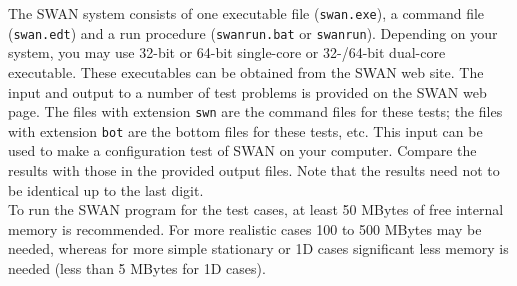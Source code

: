 \documentclass[12pt]{book}
\begin{document}
 \label{ch:test}

The SWAN system consists of one executable file ({\tt swan.exe}), a command file ({\tt swan.edt}) and
a run procedure ({\tt swanrun.bat} or {\tt swanrun}).
Depending on your system, you may use 32-bit or 64-bit single-core or 32-/64-bit dual-core executable.
These executables can be obtained from the SWAN web site.
The input and output to a number of test problems
is provided on the SWAN web page. The files with extension {\tt swn} are the command files for these
tests; the files with extension {\tt bot} are the bottom files for these tests, etc. This input can be
used to make a configuration test of SWAN on your computer. Compare the results with those in the
provided output files. Note that the results need not to be identical up to the last digit.
\\[2ex]
\noindent
To run the SWAN program for the test cases, at least 50 MBytes of free internal memory is recommended.
For more realistic cases 100 to 500 MBytes may be needed, whereas for more simple stationary or 1D
cases significant less memory is needed (less than 5 MBytes for 1D cases).
\end{document}
